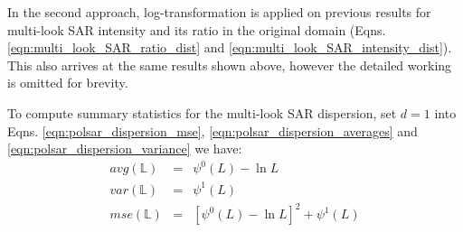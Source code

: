 \documentclass[journal]{IEEEtran}
\begin{document}
In the second approach, log-transformation is applied on previous results for multi-look SAR intensity and its ratio in the original domain (Eqns. \ref{eqn:multi_look_SAR_ratio_dist} and \ref{eqn:multi_look_SAR_intensity_dist}).
This also arrives at the same results shown above, however the detailed working is omitted for brevity.

%

To compute summary statistics for the multi-look SAR dispersion,
  set $d=1$ into Eqns. \ref{eqn:polsar_dispersion_mse}, \ref{eqn:polsar_dispersion_averages} and \ref{eqn:polsar_dispersion_variance}
we have:
  \begin{eqnarray*}
    avg(\mathbb{L}) &=& \psi^0(L) - \ln{L} \\
    var(\mathbb{L}) &=& \psi^1(L) \\
    mse(\mathbb{L}) &=& \left[ \psi^0(L) - \ln{L} \right]^2 + \psi^1(L)
\end{eqnarray*}
\end{document}
